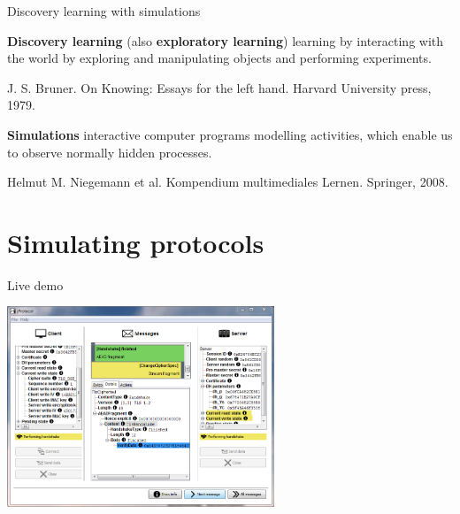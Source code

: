 \begin{frame}{Discovery learning with simulations}
	
	\begin{block}{\textbf{Discovery learning} (also \textbf{exploratory learning})}
	learning by interacting with the world by exploring and manipulating objects and performing experiments.
		\begin{flushright}
		\tiny \color{svsgrau2} J. S. Bruner. On Knowing: Essays for the left hand. Harvard University press, 1979.
		\end{flushright}
	\end{block}

\vspace{1cm}

	\begin{block}{\textbf{Simulations}}
	interactive computer programs modelling activities, which enable us to observe normally hidden processes.
		\begin{flushright}
		\tiny  \color{svsgrau2} Helmut M. Niegemann et al. Kompendium multimediales Lernen. Springer, 2008.
		\end{flushright}
	\end{block}

\end{frame}

\section{Simulating protocols}


%
%
%
%

\begin{frame}[c] {Live demo}

	\begin{center}
			\includegraphics[width=8cm]{pic/ScreenshotTLS.png}
	\end{center}

\end{frame}

